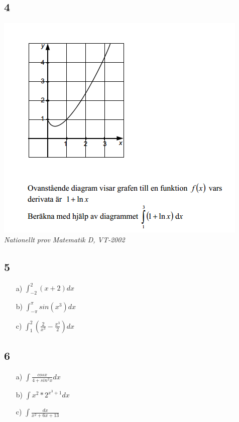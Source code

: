 \documentclass{article}
\begin{document}
\subsection*{4}
\includegraphics[scale=1]{primfunc}
\\
\textit{Nationellt prov Matematik D, VT-2002}

\subsection*{5}
\begin{itemize}
    \item[a) ] $\int_{-2}^2 (x+2) dx$
    \item[b) ] $\int_{- \pi}^{\pi} sin(x^3) dx$ 
    \item[c) ] $\int_1^2 (\frac{2}{x^3} - \frac{x^3}{2}) dx$
\end{itemize}

\subsection*{6}
\begin{itemize}
    \item[a) ] $\int \frac{cos x}{4 + sin^2 x} dx$ 
    \item[b) ] $\int x^2*2^{x^3+1} dx$ 
    \item[c) ] $\int \frac{dx}{x^2 + 6x +13}$ 
\end{itemize}
\end{document}
